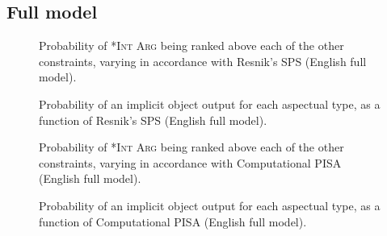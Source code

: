 \subsection{Full model} 


\begin{figure}[!htb]
\caption{Probability of \textsc{*Int Arg} being ranked above each of the other constraints, varying in accordance with Resnik's SPS (English full model).}
    
\end{figure}

\begin{figure}[!htb]
\caption{Probability of an implicit object output for each aspectual type, as a function of Resnik's SPS (English full model).}
    
\end{figure}



\begin{figure}[!htb]
\caption{Probability of \textsc{*Int Arg} being ranked above each of the other constraints, varying in accordance with Computational PISA (English full model).}
    
\end{figure}

\begin{figure}[!htb]
\caption{Probability of an implicit object output for each aspectual type, as a function of Computational PISA (English full model).}
    
\end{figure}



